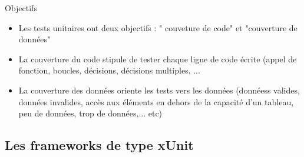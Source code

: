 \documentclass{beamer}
\begin{document}
\begin{frame}{Objectifs}
  \begin{itemize}
    
  \item{Les tests unitaires ont deux objectifs : "{\color{blue} couveture de code}" et "{\color{blue}couverture de données}"}
  \item{La couverture du code stipule de tester chaque ligne de code écrite (appel de fonction, boucles, décisions, décisions multiples, ...}
  \item{La couverture des données oriente les tests vers les données (donnéess valides, données invalides, accès aux éléments en dehors de la capacité d'un tableau, peu de données, trop de données,... etc)}
    
  \end{itemize}   
\end{frame}

\subsection{Les frameworks de type xUnit}
\end{document}
